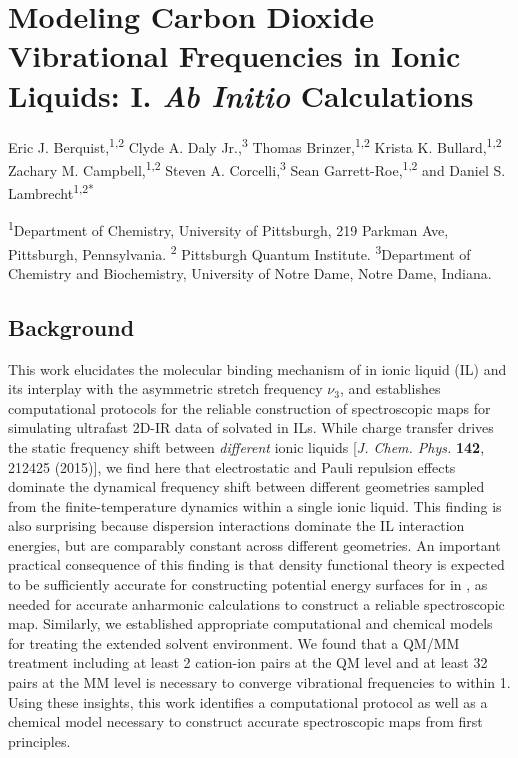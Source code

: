 \chapter{Modeling Carbon Dioxide Vibrational Frequencies in Ionic Liquids: I. \textit{Ab Initio} Calculations}
\label{ch:paper_02}

Eric J. Berquist,\textsuperscript{1,2} Clyde A. Daly Jr.,\textsuperscript{3} Thomas Brinzer,\textsuperscript{1,2} Krista K. Bullard,\textsuperscript{1,2} Zachary M. Campbell,\textsuperscript{1,2} Steven A. Corcelli,\textsuperscript{3} Sean Garrett-Roe,\textsuperscript{1,2} and Daniel S. Lambrecht\textsuperscript{1,2*}

\textsuperscript{1}Department of Chemistry, University of Pittsburgh, 219 Parkman Ave, Pittsburgh, Pennsylvania. \textsuperscript{2} Pittsburgh Quantum Institute. \textsuperscript{3}Department of Chemistry and Biochemistry, University of Notre Dame, Notre Dame, Indiana.

\section{Background}

This work elucidates the molecular binding mechanism of  in \ce{[C4C1im][PF6]} ionic liquid (IL) and its interplay with the  asymmetric stretch frequency \(\nu_{3}\), and establishes computational protocols for the reliable construction of spectroscopic maps for simulating ultrafast 2D-IR data of  solvated in ILs. While charge transfer drives the static frequency shift between \emph{different} ionic liquids {[}\emph{J. Chem. Phys.}  \textbf{142}, 212425 (2015){]}, we find here that electrostatic and Pauli repulsion effects dominate the dynamical frequency shift between different geometries sampled from the finite-temperature dynamics within a single ionic liquid. This finding is also surprising because dispersion interactions dominate the \textendash{}IL interaction energies, but are comparably constant across different geometries. An important practical consequence of this finding is that density functional theory is expected to be sufficiently accurate for constructing potential energy surfaces for  in \ce{[C4C1im][PF6]}, as needed for accurate anharmonic calculations to construct a reliable spectroscopic map. Similarly, we established appropriate computational and chemical models for treating the extended solvent environment. We found that a QM/MM treatment including at least \num{2} cation-ion pairs at the QM level and at least \num{32} pairs at the MM level is necessary to converge vibrational frequencies to within \SI{1}{\wavenumber}. Using these insights, this work identifies a computational protocol as well as a chemical model necessary to construct accurate spectroscopic maps from first principles.

